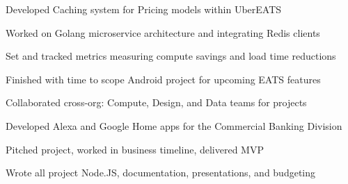 \documentclass[]{deedy-resume-openfont}
\begin{document}
\begin{minipage}[t]{0.66\textwidth}
\begin{tightemize}
\item Developed Caching system for Pricing models within UberEATS
\item Worked on Golang microservice architecture and integrating Redis clients
\item Set and tracked metrics measuring compute savings and load time reductions
\item Finished with time to scope Android project for upcoming EATS features
\item Collaborated cross-org: Compute, Design, and Data teams for projects
\end{tightemize}
\sectionsep

\begin{tightemize}
\item Developed Alexa and Google Home apps for the Commercial Banking Division
\item Pitched project, worked in business timeline, delivered MVP
\item Wrote all project Node.JS, documentation, presentations, and budgeting
\end{tightemize}
\sectionsep




\end{minipage}
\end{document}
